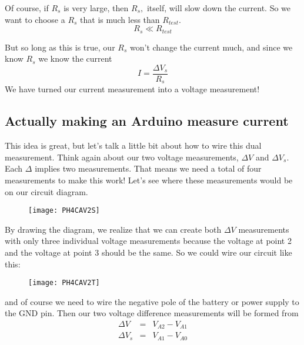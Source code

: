 Of course, if $R_{s}$ is very large, then $R_{s},$ itself, will slow down
the current. So we want to choose a $R_{s}$ that is much less than $%
R_{test}. $%
\begin{equation*}
R_{s}\ll R_{test}
\end{equation*}

But so long as this is true, our $R_{s}$ won't change the current much, and
since we know $R_{s}$ we know the current 
\begin{equation*}
I=\frac{\Delta V_{s}}{R_{s}}
\end{equation*}%
We have turned our current measurement into a voltage measurement!

\subsection{Actually making an Arduino measure current}

This idea is great, but let's talk a little bit about how to wire this dual
measurement. Think again about our two voltage measurements, $\Delta V$ and $%
\Delta V_{s}.$ Each $\Delta $ implies two measurements. That means we need a
total of four measurements to make this work! Let's see where these
measurements would be on our circuit diagram.

\begin{figure}[h!]
\texttt{[image: PH4CAV2S]}
\end{figure}By drawing the diagram, we
realize that we can create both $\Delta V$ measurements with only three
individual voltage measurements because the voltage at point 2 and the
voltage at point 3 should be the same. So we could wire our circuit like
this:\begin{figure}[h!]
\texttt{[image: PH4CAV2T]}
\end{figure}and of course we need to wire the
negative pole of the battery or power supply to the GND pin. Then our two
voltage difference measurements will be formed from 
\begin{eqnarray*}
\Delta V &=&V_{A2}-V_{A1} \\
\Delta V_{s} &=&V_{A1}-V_{A0}
\end{eqnarray*}

